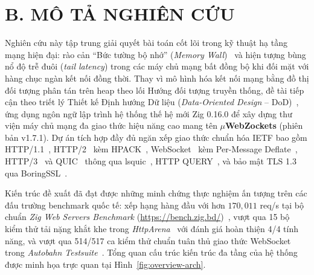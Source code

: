 \documentclass[letterpaper]{article}
\begin{document}
\section{B. MÔ TẢ NGHIÊN CỨU}

\indent \indent Nghiên cứu này tập trung giải quyết bài toán cốt lõi trong kỹ thuật hạ tầng mạng hiện đại: rào cản ``Bức tường bộ nhớ'' (\emph{Memory Wall})~\cite{drepper_memory} và hiện tượng bùng nổ độ trễ đuôi (\emph{tail latency}) trong các máy chủ mạng bất đồng bộ khi đối mặt với hàng chục ngàn kết nối đồng thời. Thay vì mô hình hóa kết nối mạng bằng đồ thị đối tượng phân tán trên heap theo lối Hướng đối tượng truyền thống, đề tài tiếp cận theo triết lý Thiết kế Định hướng Dữ liệu (\emph{Data-Oriented Design} -- DoD)~\cite{kelly_dod}, ứng dụng ngôn ngữ lập trình hệ thống thế hệ mới Zig 0.16.0 để xây dựng thư viện máy chủ mạng đa giao thức hiệu năng cao mang tên \textbf{$\mu$WebZockets} (phiên bản v1.7.1). Dự án tích hợp đầy đủ ngăn xếp giao thức chuẩn hóa IETF bao gồm HTTP/1.1~\cite{rfc9112}, HTTP/2~\cite{rfc9113} kèm HPACK~\cite{rfc7541}, WebSocket~\cite{rfc6455} kèm Per-Message Deflate~\cite{rfc7692}, HTTP/3~\cite{rfc9114} và QUIC~\cite{rfc9000} thông qua lsquic~\cite{lsquic}, HTTP QUERY~\cite{rfc10008}, và bảo mật TLS 1.3 qua BoringSSL~\cite{boringssl}.

Kiến trúc đề xuất đã đạt được những minh chứng thực nghiệm ấn tượng trên các đấu trường benchmark quốc tế: xếp hạng hàng đầu với hơn $170{,}011$ req/s tại bộ chuẩn \textit{Zig Web Servers Benchmark} (\url{https://bench.zig.bd/})~\cite{bench_zig_bd}, vượt qua 15 bộ kiểm thử tải nặng khắt khe trong \textit{HttpArena}~\cite{httparena_pr1536} với đánh giá hoàn thiện 4/4 tính năng, và vượt qua 514/517 ca kiểm thử chuẩn tuân thủ giao thức WebSocket trong \textit{Autobahn Testsuite}~\cite{autobahn}. Tổng quan cấu trúc kiến trúc đa tầng của hệ thống được minh họa trực quan tại Hình~\ref{fig:overview-arch}.
\end{document}
